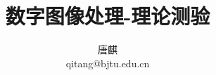 \documentclass[10pt,journal,compsoc]{IEEEtran}
\begin{document}
\begin{sloppypar}

\title{数字图像处理-理论测验}

\author{唐麒\\qitang@bjtu.edu.cn}




\maketitle

%










\ifCLASSOPTIONcaptionsoff
  \newpage
\fi



{\small


}

\end{sloppypar}
\end{document}
